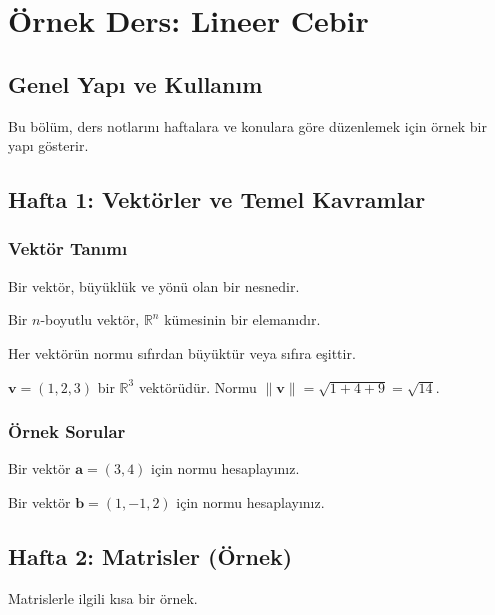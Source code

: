 \chapter{Örnek Ders: Lineer Cebir}
\section{Genel Yapı ve Kullanım}
Bu bölüm, ders notlarını haftalara ve konulara göre düzenlemek için örnek bir yapı gösterir.


\section{Hafta 1: Vektörler ve Temel Kavramlar}

\subsection{Vektör Tanımı}
Bir vektör, büyüklük ve yönü olan bir nesnedir.

\begin{definition}
Bir $n$-boyutlu vektör, $\mathbb{R}^n$ kümesinin bir elemanıdır.
\end{definition}

\begin{theorem}
Her vektörün normu sıfırdan büyüktür veya sıfıra eşittir.
\end{theorem}

\begin{exampleauto}
$\mathbf{v} = (1,2,3)$ bir $\mathbb{R}^3$ vektörüdür. Normu $\|\mathbf{v}\|=\sqrt{1+4+9}=\sqrt{14}$.
\end{exampleauto}

\subsection{Örnek Sorular}
\begin{exampleauto}
Bir vektör $\mathbf{a}=(3,4)$ için normu hesaplayınız.
\end{exampleauto}

\begin{exampleauto}
Bir vektör $\mathbf{b}=(1,-1,2)$ için normu hesaplayınız.
\end{exampleauto}

\section{Hafta 2: Matrisler (Örnek)}
Matrislerle ilgili kısa bir örnek.


